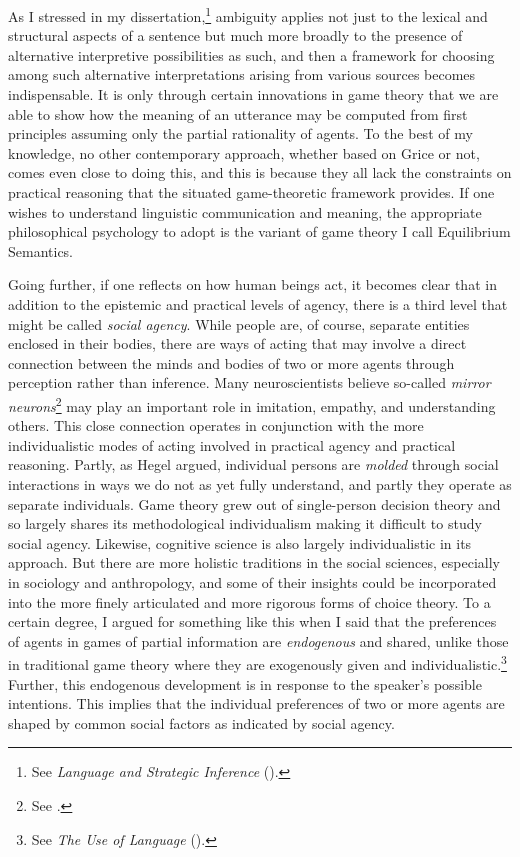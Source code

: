 As I stressed in my dissertation,\footnote{See \emph{Language and Strategic Inference} (\citeyear{parikh:diss}).} ambiguity applies not just to the lexical and structural aspects of a sentence but much more broadly to the presence of alternative interpretive possibilities as such, and then a framework for choosing among such alternative interpretations arising from various sources becomes indispensable. It is only through certain innovations in game theory that we are able to show how the meaning of an utterance may be computed from first principles assuming only the partial rationality of agents. To the best of my knowledge, no other contemporary approach, whether based on Grice or not, comes even close to doing this, and this is because they all lack the constraints on practical reasoning that the situated game-theoretic framework provides. If one wishes to understand linguistic communication and meaning, the appropriate philosophical psychology to adopt is the variant of game theory I call Equilibrium Semantics.

Going further, if one reflects on how human beings act, it becomes clear that in addition to the epistemic and practical levels of agency, there is a third level that might be called \emph{social agency}. While people are, of course, separate entities enclosed in their bodies, there are ways of acting that may involve a direct connection between the minds and bodies of two or more agents through perception rather than inference. Many neuroscientists believe so-called \emph{mirror neurons}\footnote{See \citet{rs:mb}.} may play an important role in  imitation, empathy, and understanding others. This close connection operates in conjunction with the more individualistic modes of acting involved in practical agency and practical reasoning. Partly, as Hegel argued, individual persons are \emph{molded} through social interactions in ways we do not as yet fully understand, and partly they operate as separate individuals. Game theory grew out of single-person decision theory and so largely shares its methodological individualism making it difficult to study social agency. Likewise, cognitive science is also largely individualistic in its approach. But there are more holistic traditions in the social sciences, especially in sociology and anthropology, and some of their insights could be incorporated into the more finely articulated and more rigorous forms of choice theory. To a certain degree, I argued for something like this when I said that the preferences of agents in games of partial information are \emph{endogenous} and shared, unlike those in traditional game theory where they are exogenously given and individualistic.\footnote{See \emph{The Use of Language} (\citeyear[28]{parikh:ul}).} Further, this endogenous development is in response to the speaker's possible intentions. This implies that the individual preferences of two or more agents are shaped by common social factors as indicated by social agency.

